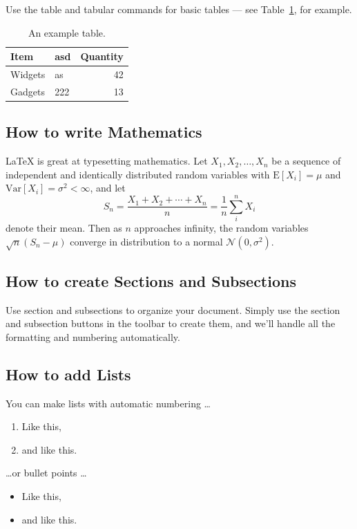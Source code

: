 Use the table and tabular commands for basic tables --- see Table~\ref{tab:widgets}, for example. 

\begin{table}
\centering
\caption{\label{tab:widgets}An example table.}
\begin{tabular}{l|lr}
Item &  asd&Quantity \\\hline
Widgets &  as&42 \\
Gadgets &  222&13
\end{tabular}

\end{table}

\subsection{How to write Mathematics}

\LaTeX{} is great at typesetting mathematics. Let $X_1, X_2, \ldots, X_n$ be a sequence of independent and identically distributed random variables with $\text{E}[X_i] = \mu$ and $\text{Var}[X_i] = \sigma^2 < \infty$, and let
\[S_n = \frac{X_1 + X_2 + \cdots + X_n}{n}
      = \frac{1}{n}\sum_{i}^{n} X_i\]
denote their mean. Then as $n$ approaches infinity, the random variables $\sqrt{n}(S_n - \mu)$ converge in distribution to a normal $\mathcal{N}(0, \sigma^2)$.


\subsection{How to create Sections and Subsections}

Use section and subsections to organize your document. Simply use the section and subsection buttons in the toolbar to create them, and we'll handle all the formatting and numbering automatically.

\subsection{How to add Lists}

You can make lists with automatic numbering \dots

\begin{enumerate}
\item Like this,
\item and like this.
\end{enumerate}
\dots or bullet points \dots
\begin{itemize}
\item Like this,
\item and like this.
\end{itemize}

